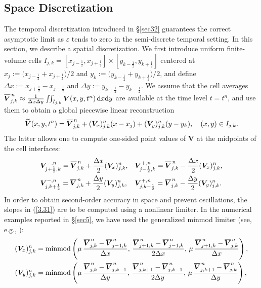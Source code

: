 \documentclass[a4paper,11pt,twoside]{article}
\numberwithin{equation}{section}
\numberwithin{figure}{section}
\numberwithin{table}{section}
\newcommand{\xL}{x_{j-\frac{1}{2}}}
\newcommand{\xR}{x_{j+\frac{1}{2}}}
\newcommand{\yL}{y_{k-\frac{1}{2}}}
\newcommand{\yR}{y_{k+\frac{1}{2}}}
\newcommand{\jL}{j-\frac{1}{2}}
\newcommand{\jR}{j+\frac{1}{2}}
\newcommand{\kL}{k-\frac{1}{2}}
\newcommand{\kR}{k+\frac{1}{2}}
\newcommand{\eps}{\varepsilon}
\newcommand{\dx}{\Delta x}
\newcommand{\dy}{\Delta y}
\newcommand{\bV}{\bm{V}}
\renewcommand{\d}{\mathrm{d}}
\newcommand\eref[1]{(\ref{#1})}
\newcommand*\xbar[1]{%
	\hbox{%
		\vbox{%
			\hrule height 0.5pt %
			\kern0.3ex%
			\hbox{%
				\kern-0.05em%
				\ensuremath{#1}%
				\kern-0.02em%
			}%
		}%
	}%
}
\begin{document}
\subsection{Space Discretization}\label{sec33}
The temporal discretization introduced in \S\ref{sec32} guarantees the correct asymptotic limit as $\eps$ tends to zero in the semi-discrete
temporal setting. In this section, we describe a spatial discretization. We first introduce uniform finite-volume cells
$I_{j,k}=[\xL,\xR]\times[\yL,\yR]$ centered at $x_j:=\big(\xL+\xR\big)/2$ and $y_k:=\big(\yL+\yR\big)/2$, and define $\dx:=\xR-\xL$ and
$\dy:=\yR-\yL$. We assume that the cell averages $\xbar{\bV}_{j,k}^{\,n}\approx\frac{1}{\dx\dy}\iint_{I_{j,k}}\bV(x,y,t^n)\,\d x\d y$ are
available at the time level $t=t^n$, and use them to obtain a global piecewise linear reconstruction
\begin{equation*}
\widetilde{\bV}(x,y,t^n)=\xbar{\bV}_{j,k}^{\,n}+(\bV_x)_{j,k}^n(x-x_j)+(\bV_y)_{j,k}^n(y-y_k),\quad(x,y)\in I_{j,k}.
\end{equation*}
The latter allows one to compute one-sided point values of $\bm V$ at the midpoints of the cell interfaces:
\begin{equation}
\begin{aligned}
&\bV_{\jR,k}^{-,n}=\xbar{\bV}_{j,k}^{\,n}+\frac{\dx}{2}(\bV_x)_{j,k}^n,&&
\bV_{\jL,k}^{+,n}=\xbar{\bV}_{j,k}^{\,n}-\frac{\dx}{2}(\bV_x)_{j,k}^n,\\
&\bV_{j,\kR}^{-,n}=\xbar{\bV}_{j,k}^{\,n}+\frac{\dy}{2}(\bV_y)_{j,k}^n,&&
\bV_{j,\kL}^{+,n}=\xbar{\bV}_{j,k}^{\,n}-\frac{\dy}{2}(\bV_y)_{j,k}^n.
\end{aligned}
\label{3.31}
\end{equation}
In order to obtain second-order accuracy in space and prevent oscillations, the slopes in \eref{3.31} are to be computed using a nonlinear
limiter. In the numerical examples reported in \S\ref{sec5}, we have used the generalized minmod limiter (see, e.g., 
\cite{Lie_2003,Nessyahu_1990,Sweby_1984}):
\begin{equation}
\begin{aligned}
(\bV_x)_{j,k}^n&={\rm minmod}\left(\mu\,\frac{\xbar{\bV}_{j,k}^{\,n}-\xbar{\bV}_{j-1,k}^{\,n}}{\dx},\,
\frac{\xbar{\bV}_{j+1,k}^{\,n}-\xbar{\bV}_{j-1,k}^{\,n}}{2\dx},\,\mu\,\frac{\xbar{\bV}_{j+1,k}^{\,n}-\xbar{\bV}_{j,k}^{\,n}}{\dx}\right),\\
(\bV_y)_{j,k}^n&={\rm minmod}\left(\mu\,\frac{\xbar{\bV}_{j,k}^{\,n}-\xbar{\bV}_{j,k-1}^{\,n}}{\dy},\,
\frac{\xbar{\bV}_{j,k+1}^{\,n}-\xbar{\bV}_{j,k-1}^{\,n}}{2\dy},\,\mu\,\frac{\xbar{\bV}_{j,k+1}^{\,n}-\xbar{\bV}_{j,k}^{\,n}}{\dy}\right),
\end{aligned}
\label{3.32}
\end{equation}
\end{document}
